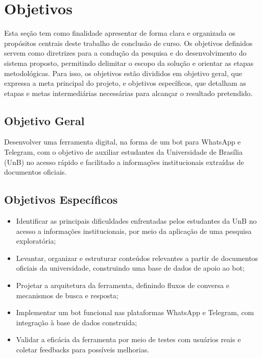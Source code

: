 \section{Objetivos}

Esta seção tem como finalidade apresentar de forma clara e organizada os propósitos centrais deste trabalho de conclusão de curso. Os objetivos definidos servem como diretrizes para a condução da pesquisa e do desenvolvimento do sistema proposto, permitindo delimitar o escopo da solução e orientar as etapas metodológicas. Para isso, os objetivos estão divididos em objetivo geral, que expressa a meta principal do projeto, e objetivos específicos, que detalham as etapas e metas intermediárias necessárias para alcançar o resultado pretendido.

\subsection{Objetivo Geral}

Desenvolver uma ferramenta digital, na forma de um bot para WhatsApp e Telegram, com o objetivo de auxiliar estudantes da Universidade de Brasília (UnB) no acesso rápido e facilitado a informações institucionais extraídas de documentos oficiais.

\subsection{Objetivos Específicos}

\begin{itemize}
    \item Identificar as principais dificuldades enfrentadas pelos estudantes da UnB no acesso a informações institucionais, por meio da aplicação de uma pesquisa exploratória;
    
    \item Levantar, organizar e estruturar conteúdos relevantes a partir de documentos oficiais da universidade, construindo uma base de dados de apoio ao bot;
    
    \item Projetar a arquitetura da ferramenta, definindo fluxos de conversa e mecanismos de busca e resposta;
    
    \item Implementar um bot funcional nas plataformas WhatsApp e Telegram, com integração à base de dados construída;
    
    \item Validar a eficácia da ferramenta por meio de testes com usuários reais e coletar feedbacks para possíveis melhorias.
\end{itemize}